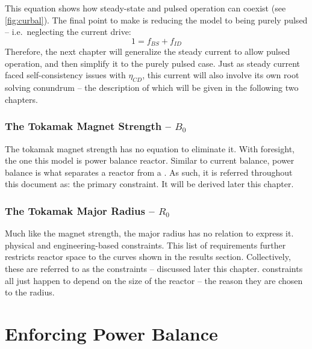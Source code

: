 This equation shows how steady-state and pulsed operation can coexist (see \cref{fig:curbal}). The final point to make is reducing the model to being purely pulsed -- i.e.\ neglecting the current drive:
\begin{equation}
	1 = f_{BS} + f_{ID}
\end{equation}
Therefore, the next chapter will generalize the steady current to allow pulsed operation, and then simplify it to the purely pulsed case. Just as steady current faced self-consistency issues with $\eta_{CD}$, this current will also involve its own root solving conundrum -- the description of which will be given in the following two chapters.

\subsubsection{The Tokamak Magnet Strength -- $B_0$}

The tokamak magnet strength has no  equation to eliminate it. With foresight, the one this model  is  power balance  reactor. Similar to current balance, power balance is what separates a reactor from a . As such, it is referred throughout this document as: the primary constraint. It will be derived later this chapter.

\subsubsection{The Tokamak Major Radius -- $R_0$}

Much like the magnet strength, the major radius has no  relation to express it.  physical and engineering-based constraints. This  list of requirements further restricts reactor space to the curves shown in the results section. Collectively, these are referred to as the  constraints -- discussed later this chapter.  constraints all just happen to depend on the size of the reactor -- the reason they are chosen to  the radius.

\section{Enforcing Power Balance}

